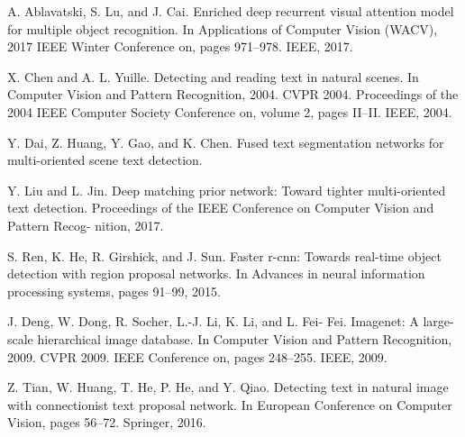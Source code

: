 
\begin{thebibliography}{99}



 A. Ablavatski, S. Lu, and J. Cai. Enriched deep recurrent
visual attention model for multiple object recognition. In
Applications of Computer Vision (WACV), 2017 IEEE Winter
Conference on, pages 971–978. IEEE, 2017.

 X. Chen and A. L. Yuille. Detecting and reading text in natural scenes. In Computer Vision and Pattern Recognition,
2004. CVPR 2004. Proceedings of the 2004 IEEE Computer
Society Conference on, volume 2, pages II–II. IEEE, 2004.

Y. Dai, Z. Huang, Y. Gao, and K. Chen. Fused text segmentation networks for multi-oriented scene text detection.
 
Y. Liu and L. Jin. Deep matching prior network: Toward
tighter multi-oriented text detection. Proceedings of the
IEEE Conference on Computer Vision and Pattern Recog-
nition, 2017.

S. Ren, K. He, R. Girshick, and J. Sun. Faster r-cnn: Towards
real-time object detection with region proposal networks. In
Advances in neural information processing systems, pages
91–99, 2015.

J. Deng, W. Dong, R. Socher, L.-J. Li, K. Li, and L. Fei-
Fei. Imagenet: A large-scale hierarchical image database.
In Computer Vision and Pattern Recognition, 2009. CVPR
2009. IEEE Conference on, pages 248–255. IEEE, 2009.

Z. Tian, W. Huang, T. He, P. He, and Y. Qiao. Detecting text
in natural image with connectionist text proposal network.
In European Conference on Computer Vision, pages 56–72.
Springer, 2016.
\end{thebibliography}


